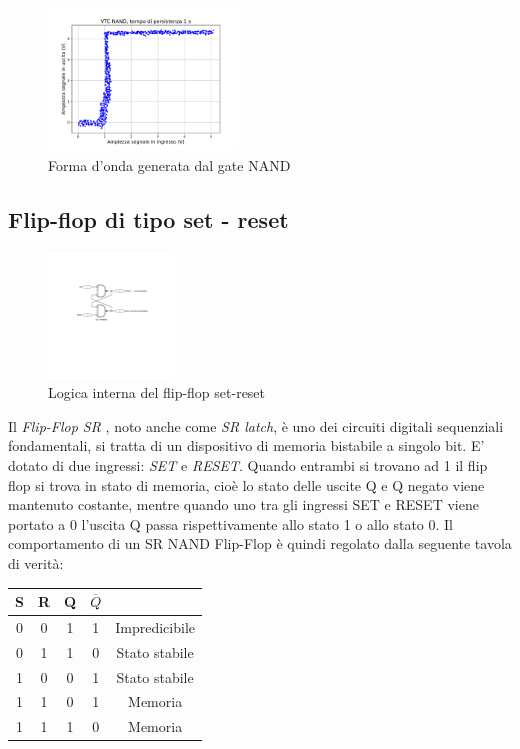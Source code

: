 \documentclass[journal]{IEEEtran}
\begin{document}
\begin{figure}[H]%
\begin{center}
\includegraphics[width=0.45\textwidth]{analysis/output/NAND-XY.pdf}
\caption{Forma d'onda generata dal gate NAND}
\label{fig:VTC NAND gate}
\end{center}
\end{figure}


\subsection{Flip-flop di tipo set - reset}
\begin{figure}[H]%
\begin{center}
\includegraphics[width=0.30\textwidth]{sch-simulations/digital/output/flip-flop-RS.pdf}
\caption{Logica interna del flip-flop set-reset}
\label{fig:circuit_flip_flop}
\end{center}
\end{figure}
Il \textit{Flip-Flop SR }, noto  anche come \textit{SR latch}, è uno dei circuiti digitali sequenziali fondamentali, si tratta di un dispositivo di memoria bistabile a singolo bit. E' dotato di due ingressi: \textit{SET} e \textit{RESET}. Quando entrambi si trovano ad 1 il flip flop si trova in stato di memoria, cioè lo stato delle uscite Q e Q negato viene mantenuto costante, mentre quando uno tra gli ingressi SET e RESET viene portato a 0 l'uscita Q passa rispettivamente allo stato 1 o allo stato 0.
Il comportamento di un SR NAND Flip-Flop è quindi regolato dalla seguente tavola di verità:
\begin{center}
\begin{tabular}{ |c|c|c|c|c| } 
 \hline
 \rowcolor{lightgray}
S & R & Q & $\overline{Q}$ &\\ \hline \hline
 0 & 0 & 1 & 1 & Impredicibile\\  \hline
 0 & 1 & 1 & 0 & Stato stabile\\ \hline
 1 & 0 & 0 & 1 & Stato stabile\\ \hline
 1 & 1 & 0 & 1 & Memoria\\ \hline
 1 & 1 & 1 & 0 & Memoria\\ \hline
 
 \hline
\end{tabular}
\end{center}
\end{document}
